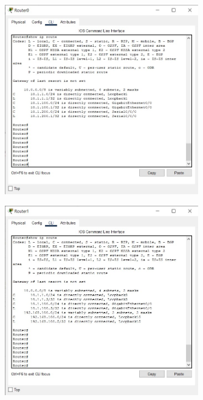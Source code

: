 \documentclass{article}
\begin{document}
\section{}%
\begin{figure}[H]
    \centering
    \includegraphics[width=0.75\textwidth]{figures/7.jpg}
    \caption{}
    \label{fig:fig1}
\end{figure}
\begin{figure}[H]
    \centering
    \includegraphics[width=0.75\textwidth]{figures/8.jpg}
    \caption{}
    \label{fig:fig1}
\end{figure}
\end{document}
